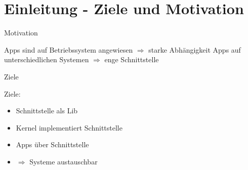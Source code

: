 \section{Einleitung - Ziele und Motivation}


\begin{frame}{Motivation}
    \begin{Large}
        Apps sind auf Betriebssystem angewiesen \newline
        $\Rightarrow$ starke Abhängigkeit \newline
        \newline
        Apps auf unterschiedlichen Systemen \newline
        $\Rightarrow$ enge Schnittstelle \newline
    \end{Large}
\end{frame}


\begin{frame}{Ziele}
    \begin{Large}
        Ziele:
    \end{Large}
    \vspace{15pt}

    \begin{itemize}
        \item Schnittstelle als Lib
        \item Kernel implementiert Schnittstelle
        \item Apps über Schnittstelle
        \item [] \quad $\Rightarrow$ Systeme austauschbar
    \end{itemize}
\end{frame}
